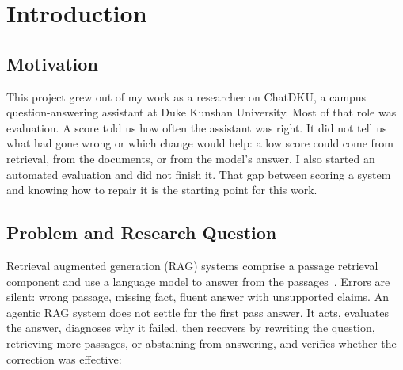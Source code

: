 \documentclass[12pt, a4paper, oneside]{report}
\begin{document}
\newpage


\setcounter{tocdepth}{1}
\listoffigures\newpage


\setcounter{tocdepth}{1}
\listoftables\newpage


\clearpage
{}


\chapter{Introduction}
\label{introduction}

\section{Motivation}

This project grew out of my work as a researcher on ChatDKU, a campus
question-answering assistant at Duke Kunshan University. Most of that role
was evaluation. A score told us how often the assistant was right. It did
not tell us what had gone wrong or which change would help: a low score
could come from retrieval, from the documents, or from the model's answer.
I also started an automated evaluation and did not finish it. That gap
between scoring a system and knowing how to repair it is the starting
point for this work.

\section{Problem and Research Question}

Retrieval augmented generation (RAG) systems comprise a passage retrieval
component and use a language model to answer from the
passages~\cite{lewis2020rag}. Errors are silent: wrong passage, missing
fact, fluent answer with unsupported claims. An agentic RAG system does not
settle for the first pass answer. It acts, evaluates the answer, diagnoses
why it failed, then recovers by rewriting the question, retrieving more
passages, or abstaining from answering, and verifies whether the correction
was effective:
\end{document}
